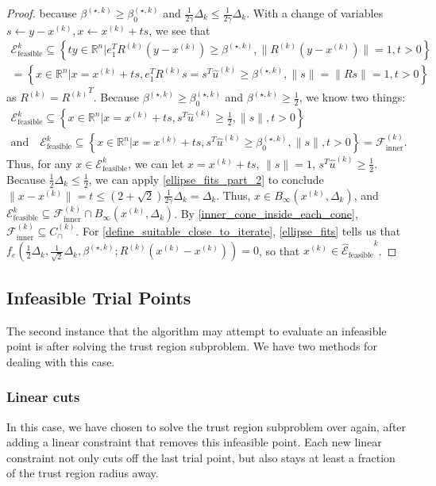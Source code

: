 \documentclass{article}
\theoremstyle{case}
\numberwithin{theorem}{subsection}
\newcommand{\bs}{{\beta^{(\star, k)}}}
\newcommand{\bsk}{{\beta_0^{(\star, k)}}}
\newcommand{\capcones}{{C^{(k)}_{\cap}}}
\newcommand{\dk}{\Delta_k}
\newcommand{\fcki}{{\mathcal {F}^{(k)}_{\textrm{inner}}}}
\newcommand{\huk}{{{\hat u}^{(k)}}}
\newcommand{\Rn}{\mathbb R^n}
\newcommand{\rotk}{{R^{(k)}}}
\newcommand{\scaledunshiftedellipsoid}{{{\mathcal {\hat E}_{\text{feasible}}}^k}}
\newcommand{\tr}{{ B_{\infty}\left(\xk, \dk\right) }}
\newcommand{\unshiftedellipsoid}{{\mathcal E^k_{\textrm{feasible}}}}
\newcommand{\xk}{{x^{(k)}}}
\begin{document}
\begin{proof}
because $\bs \ge \bsk$ and $\frac 1 {2\gamma} \dk \le \frac 1 {2\gamma} \dk$.
With a change of variables $s \gets y - \xk, x \gets \xk + t s$, we see that
\begin{align*}
\unshiftedellipsoid \subseteq \left\{t y \in \Rn | e_1^T\rotk\left(y - \xk\right) \ge \bs, \|\rotk\left(y - \xk\right)\| = 1, t > 0 \right\} \\
= \left\{x \in \Rn | x = \xk + ts, e_1^T\rotk s = s^T\huk \ge \bs, \|s\| = \|Rs\| = 1, t > 0 \right\}
\end{align*}
as $\rotk = \rotk^T$.
Because $\bs \ge \bsk$ and $\bs \ge \frac 1 2$, we know two things:
\begin{align*}
\unshiftedellipsoid \subseteq \left\{x \in \Rn | x = \xk + ts, s^T\huk \ge \frac 1 2, \|s\|, t > 0 \right\} \\
\textrm{and} \quad \unshiftedellipsoid \subseteq \left\{x \in \Rn | x = \xk + ts, s^T\huk \ge \bsk, \|s\|, t > 0 \right\} = \fcki.
\end{align*}
Thus, for any $x \in \unshiftedellipsoid$, we can let $x = \xk + ts$, $\|s\| = 1$, $s^T\huk \ge \frac 1 2$.
Because $\frac 1 2 \dk \le \frac 1 2$, we can apply \cref{ellipse_fits_part_2} to conclude $\|x - \xk\| = t \le \left(2 + \sqrt{2}\right)\frac 1 {2\gamma} \dk = \dk$.
Thus, $x \in \tr$, and $\unshiftedellipsoid \subseteq \fcki \cap \tr$.
By \cref{inner_cone_inside_each_cone}, $\fcki \subseteq \capcones$.
For \cref{define_suitable_close_to_iterate}, \cref{ellipse_fits} tells us that
$f_e\left(\frac 1 2 \dk, \frac 1 {\sqrt{2}}\dk, \bs; \rotk\left(\xk - \xk\right)\right) = 0$, so that $\xk \in \scaledunshiftedellipsoid$.
\end{proof}



\subsection{Infeasible Trial Points}
\label{convex_model_reduction}

The second instance that the algorithm may attempt to evaluate an infeasible point is after solving the trust region subproblem.
We have two methods for dealing with this case.

\subsubsection{Linear cuts}
In this case, we have chosen to solve the trust region subproblem over again, after adding a linear constraint that removes this infeasible point.
Each new linear constraint not only cuts off the last trial point, but also stays at least a fraction of the trust region radius away.
\end{document}
